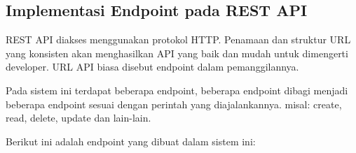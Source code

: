         \subsection{Implementasi Endpoint pada REST API }
        	REST API diakses menggunakan protokol HTTP. Penamaan dan struktur URL yang konsisten akan menghasilkan API yang baik dan mudah untuk dimengerti developer. URL API biasa disebut endpoint dalam pemanggilannya.
        	
        	Pada sistem ini terdapat beberapa endpoint, beberapa endpoint dibagi menjadi beberapa endpoint sesuai dengan perintah yang diajalankannya. misal: create, read, delete, update dan lain-lain.
        	
        	Berikut ini adalah endpoint yang dibuat dalam sistem ini:
        	
        	\begin{longtable}{|p{}|p{}|p{}|p{}|} %
        		

\end{longtable}
